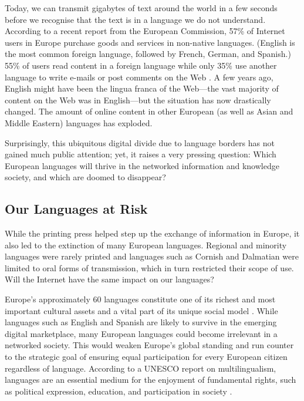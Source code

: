 \begin{multicols}{2}
Today, we can transmit gigabytes of text around the world in a few seconds before we recognise that the text is in a language we do not understand.
According to a recent report from the European Commission, 57\% of Internet users in Europe purchase goods and services in non-native languages.
(English is the most common foreign language, followed by French, German, and Spanish.) 55\% of users read content in a foreign language while only 35\% use another language to write e-mails or post comments on the Web \cite{Meta48}.
A few years ago, English might have been the lingua franca of the Web---the vast majority of content on the Web was in English---but the situation has now drastically changed.
The amount of online content in other European (as well as Asian and Middle Eastern) languages has exploded.

Surprisingly, this ubiquitous digital divide due to language borders has not gained much public attention; yet, it raises a very pressing question: Which European languages will thrive in the networked information and knowledge society, and which are doomed to disappear?

\subsection{Our Languages at Risk}

While the printing press helped step up the exchange of information in Europe, it also led to the extinction of many European languages.
Regional and minority languages were rarely printed and languages such as Cornish and Dalmatian were limited to oral forms of transmission, which in turn restricted their scope of use.
Will the Internet have the same impact on our languages?


Europe's approximately 60 languages constitute one of its richest and most important cultural assets and a vital part of its unique social model \cite{Meta49}.
While languages such as English and Spanish are likely to survive in the emerging digital marketplace, many European languages could become irrelevant in a networked society.
This would weaken Europe's global standing and run counter to the strategic goal of ensuring equal participation for every European citizen regardless of language.
According to a UNESCO report on multilingualism, languages are an essential medium for the enjoyment of fundamental rights, such as political expression, education, and participation in society \cite{Meta50}. 


\end{multicols}
